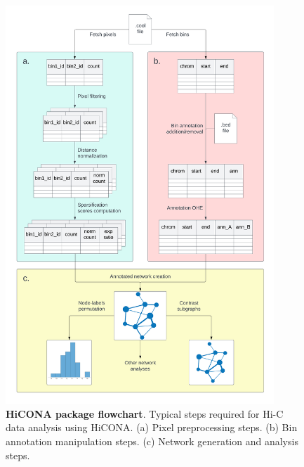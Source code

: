 \begin{figure}
  \centering
  \includegraphics[width=0.9\textwidth]{package_flowchart.png}
  \caption{\textbf{HiCONA package flowchart}. Typical steps required for Hi-C data analysis using HiCONA. (a) Pixel preprocessing steps. (b) Bin annotation manipulation steps. (c) Network generation and analysis steps.}
  \label{fig:flowchart}
\end{figure}

